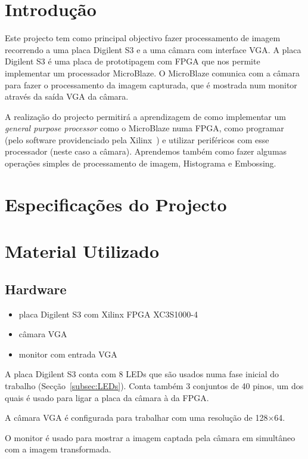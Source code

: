 \documentclass[a4paper]{article}
\begin{document}


\tableofcontents
\pagebreak

\section{Introdução}
Este projecto tem como principal objectivo fazer processamento de imagem recorrendo a uma placa Digilent S3 e a uma câmara com interface VGA. A placa Digilent S3 é uma placa de prototipagem com FPGA que nos permite implementar um processador MicroBlaze. O MicroBlaze comunica com a câmara para fazer o processamento da imagem capturada, que é mostrada num monitor através da saída VGA da câmara.

A realização do projecto permitirá a aprendizagem de como implementar um \textit{general purpose processor} como o MicroBlaze numa FPGA, como programar (pelo software providenciado pela Xilinx\textregistered\ ) e utilizar periféricos com esse processador (neste caso a câmara). Aprendemos também como fazer algumas operações simples de processamento de imagem, Histograma e Embossing.


\section{Especificações do Projecto}

\section{Material Utilizado}
\subsection*{Hardware}
\begin{itemize}
\item placa Digilent S3 com Xilinx FPGA XC3S1000-4
\item câmara VGA
\item monitor com entrada VGA
\end{itemize}

A placa Digilent S3 conta com 8 LEDs que são usados numa fase inicial do trabalho (Secção~\ref{subsec:LEDs}). Conta também 3 conjuntos de 40 pinos, um dos quais é usado para ligar a placa da câmara à da FPGA.

A câmara VGA é configurada para trabalhar com uma resolução de 128$\times$64.

O monitor é usado para mostrar a imagem captada pela câmara em simultâneo com a imagem transformada.
\end{document}
